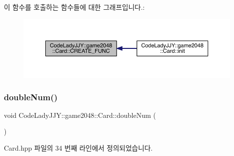 이 함수를 호출하는 함수들에 대한 그래프입니다.\+:
\nopagebreak
\begin{figure}[H]
\begin{center}
\leavevmode
\includegraphics[width=350pt]{d6/d12/class_code_lady_j_j_y_1_1game2048_1_1_card_aeef08b192f5d93d6852ebfb75bb9bd9a_icgraph}
\end{center}
\end{figure}
\mbox{\label{class_code_lady_j_j_y_1_1game2048_1_1_card_ad4cae75359815f3d80db488df3fd3dfd}} 
\subsubsection{\texorpdfstring{double\+Num()}{doubleNum()}}
{\footnotesize\ttfamily void Code\+Lady\+J\+J\+Y\+::game2048\+::\+Card\+::double\+Num (\begin{DoxyParamCaption}{ }\end{DoxyParamCaption})\hspace{0.3cm}{\ttfamily [inline]}}



Card.\+hpp 파일의 34 번째 라인에서 정의되었습니다.


